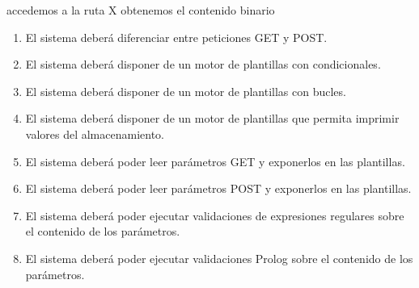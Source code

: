 \documentclass[12pt]{report} %
\begin{document}
{accedemos a la ruta X}
{obtenemos el contenido binario}



\begin{enumerate}
    \item El sistema deberá diferenciar entre peticiones GET y POST.
    \item El sistema deberá disponer de un motor de plantillas con condicionales.
    \item El sistema deberá disponer de un motor de plantillas con bucles.
    \item El sistema deberá disponer de un motor de plantillas que permita imprimir valores del almacenamiento.
    \item El sistema deberá poder leer parámetros GET y exponerlos en las plantillas.
    \item El sistema deberá poder leer parámetros POST y exponerlos en las plantillas.
    \item El sistema deberá poder ejecutar validaciones de expresiones regulares sobre el contenido de los parámetros.
    \item El sistema deberá poder ejecutar validaciones Prolog sobre el contenido de los parámetros. 

\end{enumerate}
\end{document}
